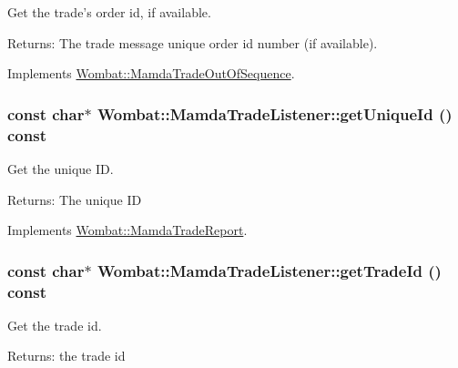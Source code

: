 Get the trade's order id, if available. 

\begin{Desc}
\item[Returns:]The trade message unique order id number (if available). \end{Desc}


Implements \hyperlink{classWombat_1_1MamdaTradeOutOfSequence_2dd8d7a5f09caeae16110a319d6f255c}{Wombat::Mamda\-Trade\-Out\-Of\-Sequence}.\hypertarget{classWombat_1_1MamdaTradeListener_997416236d779434a70ff52427ac9b8f}{
\subsubsection[getUniqueId]{\setlength{\rightskip}{0pt plus 5cm}const char$\ast$ Wombat::Mamda\-Trade\-Listener::get\-Unique\-Id () const}}
\label{classWombat_1_1MamdaTradeListener_997416236d779434a70ff52427ac9b8f}


Get the unique ID. 

\begin{Desc}
\item[Returns:]The unique ID \end{Desc}


Implements \hyperlink{classWombat_1_1MamdaTradeReport_76e8e93ea2a7f53fb2b0287572dbf7ec}{Wombat::Mamda\-Trade\-Report}.\hypertarget{classWombat_1_1MamdaTradeListener_4dcba79f4a1e795b26c382b80b6f18b5}{
\subsubsection[getTradeId]{\setlength{\rightskip}{0pt plus 5cm}const char$\ast$ Wombat::Mamda\-Trade\-Listener::get\-Trade\-Id () const}}
\label{classWombat_1_1MamdaTradeListener_4dcba79f4a1e795b26c382b80b6f18b5}


Get the trade id. 

\begin{Desc}
\item[Returns:]the trade id \end{Desc}


